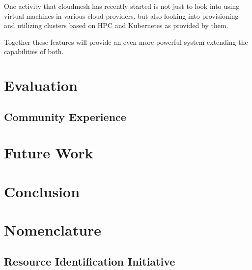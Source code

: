 \documentclass[utf8]{FrontiersinVancouver} %
\begin{document}
One activity that cloudmesh has recently started is not just to look into using virtual machines in various cloud providers, but also looking into provisioning and utilizing clusters based on HPC and Kubernetes as provided by them. 

Together these features will provide an even more powerful system extending the capabilities of both. 




\section{Evaluation}



\subsection{Community Experience}


\section{Future Work}


\section{Conclusion}



\clearpage

\section{Nomenclature}

\subsection{Resource Identification Initiative}
\end{document}

